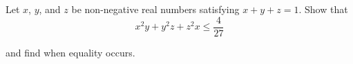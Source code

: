 Let $ x$,  $ y$,  and $ z$ be non-negative real numbers satisfying $ x + y + z = 1$.  Show that\[ x^2 y + y^2 z + z^2 x \leq \frac {4}{27}
\]

and find when equality occurs.
